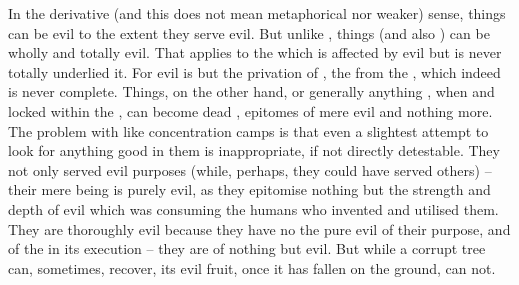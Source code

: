 In the derivative (and this does not mean {metaphorical} nor {weaker})
sense, things can be evil to the extent they serve evil.  But unlike
, things (and also ) can be wholly and totally evil.
That  applies to
the  which is affected by evil but is never
totally underlied it. For evil is but the privation of
, the  from the , which indeed is never
complete. Things, on the other hand, or
generally anything , when  and locked 
within the \hoa, can become dead , epitomes of mere evil and nothing
more.  The problem with  like concentration camps is that even a
slightest attempt to look for anything good in them is inappropriate, if not
directly detestable. They not only served evil purposes (while, perhaps, they
could have served others) -- their mere being is purely evil, as they epitomise
nothing but the strength and depth of evil which was consuming the humans who
invented and utilised them. They are thoroughly evil because they have no
  the pure evil of their purpose, and of the 
in its execution -- they are  of nothing but evil.  But
while a corrupt tree can, sometimes, recover, its evil fruit, once it has fallen
on the ground, can not.

